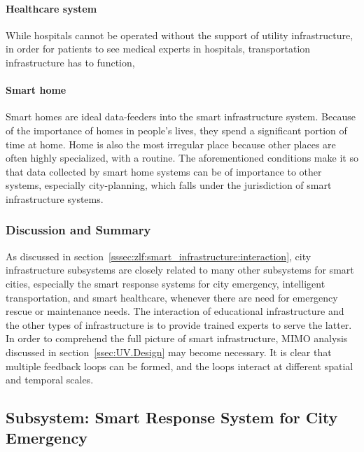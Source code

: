 \documentclass[letterpaper, twocolumn, 10pt, conference]{IEEEtran}
\begin{document}
\paragraph{Healthcare system}

While hospitals cannot be operated without the support of utility infrastructure, 
in order for patients to see medical experts in hospitals, transportation infrastructure has to function, 


\paragraph{Smart home}

Smart homes are ideal data-feeders into the smart infrastructure system. Because of the importance of homes in people’s lives, they spend a significant portion of time at home. Home is also the most irregular place because other places are often highly specialized, with a routine. The aforementioned conditions make it so that data collected by smart home systems can be of importance to other systems, especially city-planning, which falls under the jurisdiction of smart infrastructure systems.



\subsubsection{Discussion and Summary}
\label{sssec:zlf:smart_infrastructure:discussion}


As discussed in section~\ref{sssec:zlf:smart_infrastructure:interaction}, city infrastructure subsystems are closely related to many other subsystems for smart cities, especially the smart response systems for city emergency, intelligent transportation, and smart healthcare, whenever there are need for emergency rescue or maintenance needs. The interaction of educational infrastructure and the other types of infrastructure is to provide trained experts to serve the latter.
In order to comprehend the full picture of smart infrastructure, MIMO analysis discussed in section~\ref{ssec:UV.Design} may become necessary. It is clear that multiple feedback loops can be formed, and the loops interact at different spatial and temporal scales. 




\subsection{Subsystem: Smart Response System for City Emergency}
\label{ssec:zj:smart_emergency}
\end{document}
